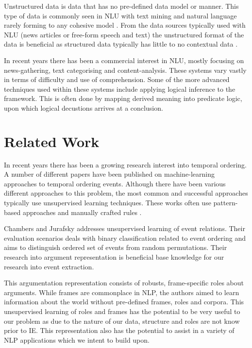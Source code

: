 \documentclass[bsc,frontabs,twoside,singlespacing,parskip,deptreport]{infthesis}     %
\begin{document}
Unstructured data is data that has no pre-defined data model or manner. This type of data is
commonly seen in NLU with text mining and natural language rarely forming to any cohesive model \cite{feldman2007text}.
From the data sources typically used with NLU (news articles or free-form speech and text) the unstructured format of
the data is beneficial as structured data typically has little to no contextual data \cite{feldman2007text}.

In recent years there has been a commercial interest in NLU, mostly focusing on news-gathering, text categorising and
content-analysis. These systems vary vastly in terms of difficulty and use of comprehension. Some of the more
advanced techniques used within these systems include applying logical inference to the framework. This is often done
by mapping derived meaning into predicate logic, upon which logical decustions arrives at a conclusion.


\section{Related Work}
In recent years there has been a growing research interest into temporal ordering.
A number of different papers have been published on machine-learning approaches to temporal ordering events.
Although there have been various different approaches to this problem, the most common and successful approaches typically
use unsupervised learning techniques. These works often use pattern-based approaches and manually crafted rules \cite{chklovski2004mining}.  

Chambers and Jurafsky\cite{chambers2009unsupervised} addresses unsupervised learning of event relations. Their evaluation
scenarios deals with binary classification related to event ordering and aims to distinguish ordered set
of events from random permutations. Their research into argument representation is beneficial base
knowledge for our research into event extraction.

This argumentation representation consists of robusts,
frame-specific roles about arguments. While frames are commonplace in NLP, the authors aimed to learn information
about the world without pre-defined frames, roles and corpora. This unsupervised learning of roles and frames has the
potential to be very useful to our problem as due to the nature of our data, structure and roles are not know prior to
IE. This representation also has the potential to assist in a variety of NLP applications \cite{chambers2009unsupervised} which
we intent to build upon.
\end{document}
